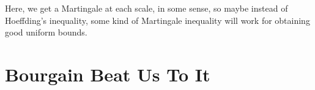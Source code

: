 \documentclass[dvipsnames,letterpaper,12pt]{article}
\numberwithin{equation}{section}
\DeclareMathOperator{\RR}{\mathbb{R}}
\DeclareMathOperator{\ZZ}{\mathbb{Z}}
\numberwithin{theorem}{section}
\DeclareMathOperator{\EE}{\mathbb{E}}
\begin{document}
\begin{comment}
Now the $L^p$ norm of the function
%
\[ N^{-k/p} \left( \sum_{i_1} e^{2 \pi i (M_{i_1} / N) x} \sum_{i_2} e^{2 \pi i (M_{i_1,i_2} / N^2) x} \dots \EE \left( \sum_{i_k} e^{2 \pi i (M_{i_1,\dots,i_k} / N^k) x} a_i \right) \right) \phi(x/N^k) \]
%
is bounded by
%
\[ C \cdot N^{-k/p} D_{k-1} \left( \sum_{i_1,\dots,i_{k-1}} \left\| \EE \left( \sum_{i_k} e^{2 \pi i (M_{i_1,\dots,i_k} / N^k) x} a_i \phi(x/2N) \right) \right\|_{L^p(\RR^d)}^2 \right)^{1/2} \]
%
which assuming $\sum |a_i|^2 = 1$, can be as bad as
%
\[ C \cdot N^{1-1/p} D_{k-1} M^{1/2}. \]
%
s

Now
%
\[ \EE \left[ e^{2 \pi i (M_{i_1,\dots,i_k} / N^k) x} \right] = \frac{1}{N} \sum_{j = 0}^{N-1} e^{2 \pi i (x/N^k) j} = (1/N) \frac{e^{2 \pi i x/N^{k-1}} - 1}{e^{2 \pi i x / N^k} - 1}. \]
%
This quantity becomes small when $d(x, N^{k-1} \ZZ) \lesssim N^{k-1}$, and large (on the scale of $O(1)$) when $x$ nears an integer multiple of $N^k$. Applying Cauchy-Schwartz, we conclude that
%
\[ \EE \left[ \sum_{i_k} e^{2 \pi i (M_{i_1,\dots,i_k} / N^k) x} a_{i_1,\dots,i_k} \right] = \frac{e^{2 \pi i x/N^{k-1}} - 1}{e^{2 \pi i x / N^k} - 1} \cdot \EE \left[ \sum_{i_k} a_{i_1,\dots,i_k} \right]. \]
%
In the worst case then, this expected value can be $O(N M^{1/2})$, and outside a set of total length $O(N^{k-1})$, it is likely to be on the other of $O(M^{1/2})$. Applying Hoeffding's inequality, if
%
\[ S_{i_1,\dots,i_{k-1}} = \sum_{i_k} e^{2 \pi i (M_{i_1,\dots,i_k} / N^k) x} a_{i_1,\dots,i_k}, \]
%
\end{comment}

\begin{comment}
Thus applying a union bound over all $i_1,\dots,i_{k-1}$, $S_{i_1,\dots,i_{k-1}}$ deviates from it's expected value by at most $O(\log M \cdot |a_{i_1,\dots,i_{k-1}}|)$ with high probability. Thus summing over $i_1,\dots,i_{k-1}$, we get a total error of
%
\[ O( \log M \sum_{i_1,\dots,i_{k-1}} |a_{i_1,\dots,i_{k-1}}| ) \]

we get that for each $i_1,\dots,i_{k-1}$,
%
\[ \| \sum_{i_k} e^{2 \pi i (M_{i_1,\dots,i_k} / N^k) x} a_{i_1,\dots,i_k} - \EE[] \|_{\psi_2} \lesssim \left( \sum \right)^{1/2} \]
\end{comment}


Here, we get a Martingale at each scale, in some sense, so maybe instead of Hoeffding's inequality, some kind of Martingale inequality will work for obtaining good uniform bounds.


\section{Bourgain Beat Us To It}
\end{document}

